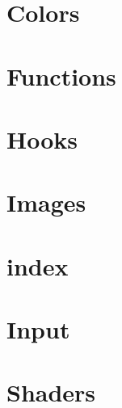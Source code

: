 \documentclass[twoside]{book}
\newcommand{\+}{\discretionary{\mbox{\scriptsize$\hookleftarrow$}}{}{}}
\begin{document}
\chapter{Colors}
\label{md__home_ssergiu_projects_cub3d_external_MLX42_docs_Colors}

\chapter{Functions}
\label{md__home_ssergiu_projects_cub3d_external_MLX42_docs_Functions}

\chapter{Hooks}
\label{md__home_ssergiu_projects_cub3d_external_MLX42_docs_Hooks}

\chapter{Images}
\label{md__home_ssergiu_projects_cub3d_external_MLX42_docs_Images}

\chapter{index}
\label{md__home_ssergiu_projects_cub3d_external_MLX42_docs_index}

\chapter{Input}
\label{md__home_ssergiu_projects_cub3d_external_MLX42_docs_Input}

\chapter{Shaders}
\label{md__home_ssergiu_projects_cub3d_external_MLX42_docs_Shaders}

\end{document}
